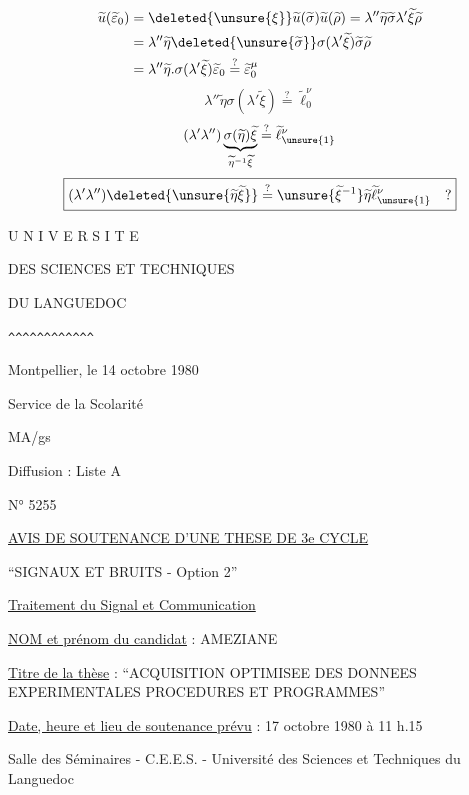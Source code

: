\[
\begin{aligned}
\widetilde u(\widetilde\varepsilon_0)
 &=\deleted{\unsure{\xi}}\widetilde u(\widetilde\sigma)\widetilde u(\widetilde\rho)
 =\lambda''\widetilde\eta\widetilde\sigma\lambda'\widetilde\xi\widetilde\rho\\
 &=\lambda''\widetilde\eta\deleted{\unsure{\widetilde\sigma}}
     \sigma(\lambda'\widetilde\xi)\widetilde\sigma\widetilde\rho\\
 &=\lambda''\widetilde\eta.\sigma(\lambda'\widetilde\xi)
   \widetilde\varepsilon_0\overset?=\widetilde\varepsilon_0^\mu
\end{aligned}
\]
\[
\lambda''\widetilde\eta\sigma(\lambda'\widetilde\xi)
 \overset?=\widetilde\ell_0^\nu
\]
\[
(\lambda'\lambda'')
 \underbrace{\sigma(\widetilde\eta)\widetilde\xi}
 _{\widetilde\eta^{-1}\widetilde\xi}
 \overset?=\widetilde\ell_{\unsure{1}}^\nu
\]
\margin{\[
\widetilde\eta=\widetilde\beta\sigma(\widetilde\beta^{-1})
\]
\[
\sigma(\widetilde\eta)=\sigma(\widetilde\beta)\widetilde\beta^{-1}
=\widetilde\eta^{-1}
\]}
\[
\boxed{(\lambda'\lambda'')\deleted{\unsure{\widetilde\eta\widetilde\xi}}
 \overset?=\unsure{\widetilde\xi^{-1}}\widetilde\eta
 \widetilde\ell_{\unsure{1}}^\nu\quad ?}
\]

U N I V E R S I T E

DES SCIENCES ET TECHNIQUES

DU LANGUEDOC

\verb|^^^^^^^^^^^^|

\hfill Montpellier, le 14 octobre 1980

Service de la Scolarité

MA/gs

Diffusion : Liste A

N° 5255

\begin{center}
\uline{AVIS DE SOUTENANCE D'UNE THESE DE 3e CYCLE}

``SIGNAUX ET BRUITS - Option 2''

\uline{Traitement du Signal et Communication}
\end{center}

\uline{NOM et prénom du candidat} : AMEZIANE 

\uline{Titre de la thèse} : ``ACQUISITION OPTIMISEE DES DONNEES EXPERIMENTALES PROCEDURES ET PROGRAMMES''

\uline{Date, heure et lieu de soutenance prévu} : 17 octobre 1980 à 11 h.15

Salle des Séminaires - C.E.E.S. - Université des Sciences et Techniques du Languedoc


